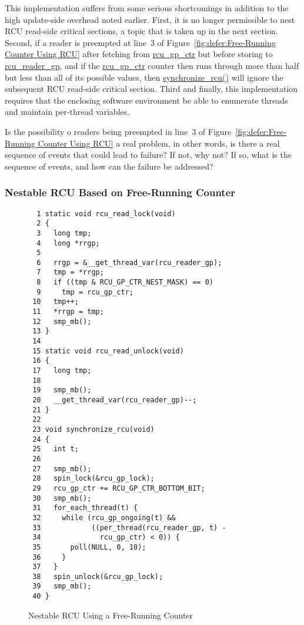 This implementation suffers from some serious shortcomings in
addition to the high update-side overhead noted earlier.
First, it is no longer permissible to nest RCU read-side critical
sections, a topic that is taken up in the next section.
Second, if a reader is preempted at line~3 of
Figure~\ref{fig:defer:Free-Running Counter Using RCU} after fetching from
\url{rcu_gp_ctr} but before storing to \url{rcu_reader_gp},
and if the \url{rcu_gp_ctr} counter then runs through more than half
but less than all of its possible values, then \url{synchronize_rcu()}
will ignore the subsequent RCU read-side critical section.
Third and finally, this implementation requires that the enclosing software
environment be able to enumerate threads and maintain per-thread
variables.

\QuickQuiz{}
	Is the possibility o readers being preempted in
	line~3 of Figure~\ref{fig:defer:Free-Running Counter Using RCU}
	a real problem, in other words, is there a real sequence
	of events that could lead to failure?
	If not, why not?
	If so, what is the sequence of events, and how can the
	failure be addressed?
 \QuickQuizEnd

\subsubsection{Nestable RCU Based on Free-Running Counter}
\label{defer:Nestable RCU Based on Free-Running Counter}

\begin{figure}[tbp]
{ \scriptsize
\begin{verbatim}
  1 static void rcu_read_lock(void)
  2 {
  3   long tmp;
  4   long *rrgp;
  5
  6   rrgp = &__get_thread_var(rcu_reader_gp);
  7   tmp = *rrgp;
  8   if ((tmp & RCU_GP_CTR_NEST_MASK) == 0)
  9     tmp = rcu_gp_ctr;
 10   tmp++;
 11   *rrgp = tmp;
 12   smp_mb();
 13 }
 14
 15 static void rcu_read_unlock(void)
 16 {
 17   long tmp;
 18
 19   smp_mb();
 20   __get_thread_var(rcu_reader_gp)--;
 21 }
 22
 23 void synchronize_rcu(void)
 24 {
 25   int t;
 26
 27   smp_mb();
 28   spin_lock(&rcu_gp_lock);
 29   rcu_gp_ctr += RCU_GP_CTR_BOTTOM_BIT;
 30   smp_mb();
 31   for_each_thread(t) {
 32     while (rcu_gp_ongoing(t) &&
 33            ((per_thread(rcu_reader_gp, t) -
 34              rcu_gp_ctr) < 0)) {
 35       poll(NULL, 0, 10);
 36     }
 37   }
 38   spin_unlock(&rcu_gp_lock);
 39   smp_mb();
 40 }
\end{verbatim}
}
\caption{Nestable RCU Using a Free-Running Counter}
\label{fig:defer:Nestable RCU Using a Free-Running Counter}
\end{figure}

